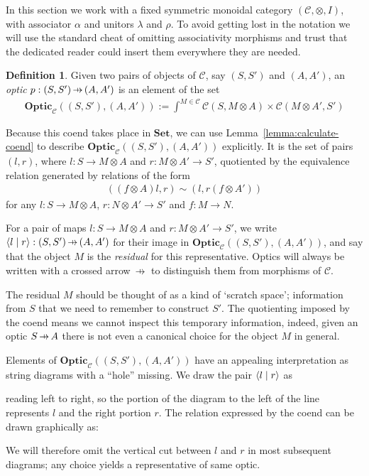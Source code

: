 \documentclass[11pt,letterpaper]{article}
\theoremstyle{plain}
\theoremstyle{definition}
\newtheorem{definition}[theorem]{Definition}
\newcommand{\C}{\mathscr{C}}
\newcommand{\Set}{\mathbf{Set}}
\newcommand{\Optic}{\mathbf{Optic}}
\newcommand{\rep}[2]{{\ensuremath \left\langle #1 \mid #2 \right\rangle}}
\newcommand{\hto}{\ensuremath{\,\mathaccent\shortmid\rightarrow\,}}
\begin{document}
  In this section we work with a fixed symmetric monoidal category $(\C, \otimes, I)$, with associator $\alpha$ and unitors $\lambda$ and $\rho$. To avoid getting lost in the notation we will use the standard cheat of omitting associativity morphisms and trust that the dedicated reader could insert them everywhere they are needed.

\begin{definition}
  Given two pairs of objects of $\C$, say $(S, S')$ and $(A, A')$, an \emph{optic} $p : (S, S') \hto (A, A')$ is an element of the set
  \begin{align*}
    \Optic_\C((S, S'), (A, A')) := \int^{M \in \C} \C(S, M \otimes A) \times \C(M \otimes A', S')
  \end{align*}
\end{definition}

Because this coend takes place in $\Set$, we can use Lemma~\ref{lemma:calculate-coend} to describe $\Optic_\C((S, S'), (A, A'))$ explicitly. It is the set of pairs $(l, r)$, where $l : S \to M \otimes A$ and $r : M \otimes A' \to S'$, quotiented by the equivalence relation generated by relations of the form
\begin{align*}
  ((f \otimes A) l, r) \sim (l, r (f \otimes A'))
\end{align*}
for any $l : S \to M \otimes A$, $r : N \otimes A' \to S'$ and $f : M \to N$.

For a pair of maps $l : S \to M \otimes A$ and $r : M \otimes A' \to S'$, we write $\rep{l}{r} : (S, S') \hto (A, A')$ for their image in $\Optic_\C((S, S'), (A, A'))$, and say that the object $M$ is the \emph{residual} for this representative. Optics will always be written with a crossed arrow $\hto$ to distinguish them from morphisms of $\C$.

  The residual $M$ should be thought of as a kind of `scratch space'; information from $S$ that we need to remember to construct $S'$. The quotienting imposed by the coend means we cannot inspect this temporary information, indeed, given an optic $S \hto A$ there is not even a canonical choice for the object $M$ in general.
    
  Elements of $\Optic_\C((S, S'), (A, A'))$ have an appealing
  interpretation as string diagrams with a ``hole'' missing. We draw the
  pair $\rep{l}{r}$ as
  \begin{center}
    
  \end{center}
  reading left to right, so the portion of the diagram to the left of the line represents $l$ and the right portion $r$. The relation expressed by the coend can be drawn graphically as:
  \begin{center}
    
    \hspace{0.7cm} \raisebox{1.35cm}{$\sim$} \hspace{1cm}
    
  \end{center}
  We will therefore omit the vertical cut between $l$ and $r$ in most subsequent diagrams; any choice yields a representative of same optic.
\end{document}
